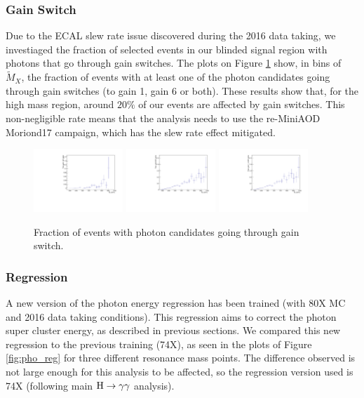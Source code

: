 \subsubsection{Gain Switch}

Due to the ECAL slew rate issue discovered during the 2016 data taking, we investiaged the fraction of selected events in our blinded signal region with photons that go through gain switches. 
The plots on Figure \ref{fig:gain_switch}  show, in bins of $\tilde{M}_{X}$, the fraction of events with at least one of the photon candidates going through gain switches (to gain 1, gain 6 or both). 
These results show that, for the high mass region, around $20\%$ of our events are affected by gain switches. 
This non-negligible rate means that the analysis needs to use the re-MiniAOD Moriond17 campaign, which has the slew rate effect mitigated.

\begin{figure}[thb]
  \centering
  \includegraphics[width=0.3\textwidth]{figures/sec-photons/rg1}\hfil
  \includegraphics[width=0.3\textwidth]{figures/sec-photons/rg6}\hfil
  \includegraphics[width=0.3\textwidth]{figures/sec-photons/rg16}\hfil
  \caption{Fraction of events with photon candidates going through gain switch.}
  \label{fig:gain_switch}
\end{figure}

\subsubsection{Regression}

A new version of the photon energy regression has been trained (with 80X MC and 2016 data taking conditions). 
This regression aims to correct the photon super cluster energy, as described in previous sections.  
We compared this new regression to the previous training (74X), as seen in the plots of Figure \ref{fig:pho_reg} for three different resonance mass points. 
The difference observed is not large enough for this analysis to be affected, so the regression version used is 74X (following main $\mathrm{H}\to\gamma\gamma$ analysis).

